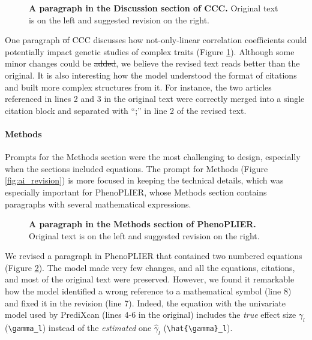 \documentclass[
]{article}
\providecommand{\DIFaddtex}[1]{{\protect\color{blue}\uwave{#1}}} %
\providecommand{\DIFdeltex}[1]{{\protect\color{red}\sout{#1}}}                      %
\providecommand{\DIFaddbegin}{} %
\providecommand{\DIFaddend}{} %
\providecommand{\DIFdelbegin}{} %
\providecommand{\DIFdelend}{} %
\providecommand{\DIFadd}[1]{\texorpdfstring{\DIFaddtex{#1}}{#1}} %
\providecommand{\DIFdel}[1]{\texorpdfstring{\DIFdeltex{#1}}{}} %
\newcommand{\DIFscaledelfig}{0.5}
\newlength{\DIFdelgraphicswidth} %
\newlength{\DIFdelgraphicsheight} %
\newcommand{\DIFaddincludegraphics}[2][]{{\color{blue}\fbox{\DIFOincludegraphics[#1]{#2}}}} %
\newcommand{\DIFdelincludegraphics}[2][]{%
\sbox{\DIFdelgraphicsbox}{\DIFOincludegraphics[#1]{#2}}%
\settoboxwidth{\DIFdelgraphicswidth}{\DIFdelgraphicsbox} %
\settoboxtotalheight{\DIFdelgraphicsheight}{\DIFdelgraphicsbox} %
\scalebox{\DIFscaledelfig}{%
\parbox[b]{\DIFdelgraphicswidth}{\usebox{\DIFdelgraphicsbox}\\[-\baselineskip] \rule{\DIFdelgraphicswidth}{0em}}\llap{\resizebox{\DIFdelgraphicswidth}{\DIFdelgraphicsheight}{%
\setlength{\unitlength}{\DIFdelgraphicswidth}%
\begin{picture}(1,1)%
\thicklines\linethickness{2pt} %
{\color[rgb]{1,0,0}\put(0,0){\framebox(1,1){}}}%
{\color[rgb]{1,0,0}\put(0,0){\line( 1,1){1}}}%
{\color[rgb]{1,0,0}\put(0,1){\line(1,-1){1}}}%
\end{picture}%
}\hspace*{3pt}}} %
} %
\DeclareRobustCommand{\DIFaddbegin}{\DIFOaddbegin \let\includegraphics\DIFaddincludegraphics} %
\DeclareRobustCommand{\DIFaddend}{\DIFOaddend \let\includegraphics\DIFOincludegraphics} %
\DeclareRobustCommand{\DIFdelbegin}{\DIFOdelbegin \let\includegraphics\DIFdelincludegraphics} %
\DeclareRobustCommand{\DIFdelend}{\DIFOaddend \let\includegraphics\DIFOincludegraphics} %
\begin{document}
\begin{figure}
\hypertarget{fig:discussion:ccc}{%
\centering

\caption{\textbf{A paragraph in the Discussion section of CCC.}
Original text is on the left and suggested revision on the right.}\label{fig:discussion:ccc}
}
\end{figure}

One paragraph \DIFdelbegin \DIFdel{of }\DIFdelend \DIFaddbegin \DIFadd{from }\DIFaddend CCC discusses how not-only-linear correlation coefficients could potentially impact genetic studies of complex traits (Figure \ref{fig:discussion:ccc}).
Although some minor changes could be \DIFdelbegin \DIFdel{added}\DIFdelend \DIFaddbegin \DIFadd{incorporated}\DIFaddend , we believe the revised text reads better than the original.
It is also interesting \DIFaddbegin \DIFadd{to see }\DIFaddend how the model understood the format of citations and built more complex structures from it.
For instance, the two articles referenced in lines 2 and 3 in the original text were correctly merged into a single citation block and separated with \DIFaddbegin \DIFadd{a }\DIFaddend ``;'' in line 2 of the revised text.

\hypertarget{methods}{%
\paragraph{Methods}\label{methods}}

Prompts for the Methods section were the most challenging to design, especially when the sections included equations.
The prompt for Methods (Figure \ref{fig:ai_revision}) is more focused in keeping the technical details, which was especially important for PhenoPLIER, whose Methods section contains paragraphs with several mathematical expressions.

\begin{figure}
\hypertarget{fig:methods:phenoplier}{%
\centering

\caption{\textbf{A paragraph in the Methods section of PhenoPLIER.}
Original text is on the left and suggested revision on the right.}\label{fig:methods:phenoplier}
}
\end{figure}

We revised a paragraph in PhenoPLIER that contained two numbered equations (Figure \ref{fig:methods:phenoplier}).
The model made very few changes, and all the equations, citations, and most of the original text were preserved.
However, we found it remarkable how the model identified a wrong reference to a mathematical symbol (line 8) and fixed it in the revision (line 7).
Indeed, the equation with the univariate model used by PrediXcan (lines 4-6 in the original) includes the \emph{true} effect size \(\gamma_l\) (\texttt{\textbackslash{}gamma\_l}) instead of the \emph{estimated} one \(\hat{\gamma}_l\) (\texttt{\textbackslash{}hat\{\textbackslash{}gamma\}\_l}).
\end{document}
